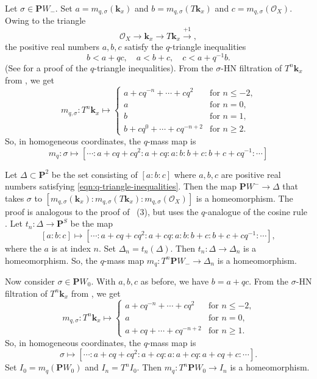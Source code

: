 \documentclass{amsart}
\begin{document}
Let \(\sigma \in \mathbf{P}W_-\).
Set \(a = m_{q,\sigma}(\mathbf{k}_x)\) and \(b = m_{q,\sigma}(T\mathbf{k}_x)\) and \(c = m_{q,\sigma}(\mathcal{O}_X)\).
Owing to the triangle 
\[ \mathcal{O}_X \to \mathbf{k}_x \to T\mathbf{k}_x \xrightarrow{+1},\]
the positive real numbers \(a,b,c\) satisfy the \(q\)-triangle inequalities 
\begin{equation}\label{eqn:q-triangle-inequalities}
  b < a + qc, \quad a < b + c, \quad c < a + q^{-1}b.
\end{equation}
(See \cite[Proposition~3.3]{ike:21} for a proof of the \(q\)-triangle inequalities).
From the \(\sigma\)-HN filtration of \(T^n\mathbf{k}_x\) from , we get
\[ m_{q, \sigma} \colon T^n \mathbf{k}_x \mapsto
  \begin{cases}
    a + cq^{-n}+ \cdots + c q^{2} &\text{for \(n \leq -2\),}\\
    a &\text{for \(n = 0\),}\\
    b & \text{for \(n = 1\),}\\
    b + c q^0 + \cdots + c q^{-n+2} & \text{for \(n \geq 2\)}.
  \end{cases}
\]
So, in homogeneous coordinates, the \(q\)-mass map is
\[ m_q \colon \sigma \mapsto [ \cdots :a + cq+cq^2 : a + cq :a: b: b + c : b + c + c q^{-1} : \cdots ]\]

Let \(\Delta \subset \mathbf{P}^2\) be the set consisting of \([a:b:c]\) where \(a,b,c\) are positive real numbers satisfying \eqref{eqn:q-triangle-inequalities}.
Then the map \( \mathbf{P} W^- \to \Delta\)
that takes \(\sigma\) to \([m_{q,\sigma}(\mathbf{k}_x):m_{q,\sigma}(T\mathbf{k}_x): m_{q,\sigma}(\mathcal{O}_X)]\)
is a homeomorphism.
The proof is analogous to the proof of ~(3), but uses the \(q\)-analogue of the cosine rule \cite[Lemma~5.2]{bap.bec.lic:22}.
Let \(t_n \colon \Delta \to \mathbf{P}^S\) be the map
\[ [a:b:c] \mapsto [ \cdots :a + cq+cq^2 : a + cq :a: b: b + c : b + c + c q^{-1} : \cdots ],\]
where the \(a\) is at index \(n\).
Set \(\Delta_n = t_n(\Delta)\).
Then \(t_n \colon \Delta \to \Delta_n\) is a homeomorphism.
So, the \(q\)-mass map \(m_{q} \colon T^n\mathbf{P}W_- \to \Delta_n\) is a homeomorphism.

Now consider \(\sigma \in \mathbf{P}W_0\).
With \(a,b,c\) as before, we have \(b = a + qc\).
From the \(\sigma\)-HN filtration of \(T^n\mathbf{k}_x\) from , we get
\[ m_{q, \sigma} \colon T^n \mathbf{k}_x \mapsto
  \begin{cases}
    a + cq^{-n}+ \cdots + c q^{2} &\text{for \(n \leq -2\),}\\
    a &\text{for \(n = 0\),}\\
    a + cq + \cdots + c q^{-n+2} & \text{for \(n \geq 1\)}.
  \end{cases}
\]
So, in homogeneous coordinates, the \(q\)-mass map is
\[ \sigma \mapsto [ \cdots :a + cq+cq^2 : a + cq :a: a+cq: a + cq + c: \cdots ].\]
Set \(I_{0} = m_q(\mathbf{P}W_0)\) and \(I_n = T^nI_0\).
Then \(m_q \colon T^n \mathbf{P}W_0 \to I_n\) is a homeomorphism.
\end{document}
